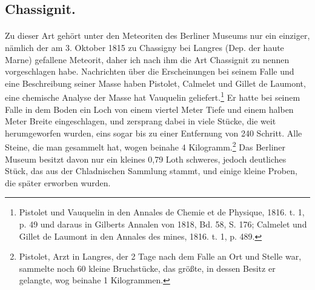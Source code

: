 \documentclass[a4paper, 11pt, oneside]{article}
\begin{document}
\subsection{Chassignit.}
\paragraph{}
Zu dieser Art gehört unter den Meteoriten des Berliner Museums nur ein einziger, nämlich der am 3. Oktober 1815 zu Chassigny bei Langres (Dep. der haute Marne) gefallene Meteorit, daher ich nach ihm die Art Chassignit zu nennen vorgeschlagen habe. Nachrichten über die Erscheinungen bei seinem Falle und eine Beschreibung seiner Masse haben Pistolet, Calmelet und Gillet de Laumont, eine chemische Analyse der Masse hat Vauquelin geliefert.\footnote{Pistolet und Vauquelin in den Annales de Chemie et de Physique, 1816. t. 1, p. 49 und daraus in Gilberts Annalen von 1818, Bd. 58, S. 176; Calmelet und Gillet de Laumont in den Annales des mines, 1816. t. 1, p. 489.} Er hatte bei seinem Falle in dem Boden ein Loch von einem viertel Meter Tiefe und einem halben Meter Breite eingeschlagen, und zersprang dabei in viele Stücke, die weit herumgeworfen wurden, eins sogar bis zu einer Entfernung von 240 Schritt. Alle Steine, die man gesammelt hat, wogen beinahe 4 Kilogramm.\footnote{Pistolet, Arzt in Langres, der 2 Tage nach dem Falle an Ort und Stelle war, sammelte noch 60 kleine Bruchstücke, das größte, in dessen Besitz er gelangte, wog beinahe 1 Kilogrammen.} Das Berliner Museum besitzt davon nur ein kleines 0,79 Loth schweres, jedoch deutliches Stück, das aus der Chladnischen Sammlung stammt, und einige kleine Proben, die später erworben wurden.
\end{document}
